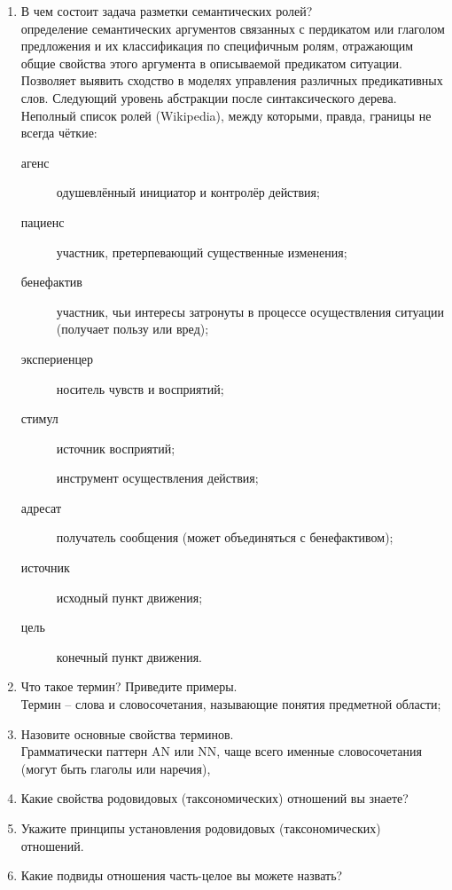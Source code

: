 \documentclass[a4paper]{article}
\begin{document}
\begin{enumerate}
	\item В чем состоит задача разметки семантических ролей?\hfill\\
	определение семантических аргументов связанных с пердикатом или глаголом предложения и их классификация по специфичным ролям, отражающим общие свойства этого аргумента в описываемой предикатом ситуации. Позволяет выявить сходство в моделях управления различных предикативных слов. Следующий уровень абстракции после синтаксического дерева.	Неполный список ролей (Wikipedia), между которыми, правда, границы не всегда чёткие: \begin{description}
		\item[агенс] одушевлённый инициатор и контролёр действия;
		\item[пациенс] участник, претерпевающий существенные изменения;
		\item[бенефактив] участник, чьи интересы затронуты в процессе осуществления ситуации (получает пользу или вред);
		\item[экспериенцер] носитель чувств и восприятий;
		\item[стимул] источник восприятий;
		\item[] инструмент осуществления действия;
		\item[адресат] получатель сообщения (может объединяться с бенефактивом);
		\item[источник] исходный пункт движения;
		\item[цель] конечный пункт движения.
	\end{description} 

	\item Что такое термин? Приведите примеры.\hfill\\
	Термин -- слова и словосочетания, называющие понятия предметной области;

	\item Назовите основные свойства терминов.\hfill\\
	Грамматически паттерн AN или NN, чаще всего именные словосочетания (могут быть глаголы или наречия),

	\item Какие свойства родовидовых (таксономических) отношений вы знаете?\hfill\\
	\item Укажите принципы установления родовидовых (таксономических) отношений.\hfill\\
	\item Какие подвиды отношения часть-целое вы можете назвать?\hfill\\


\end{enumerate}
\end{document}
